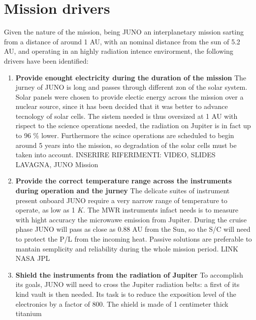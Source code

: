 \section{Mission drivers}
\label{sec:drivers}

Given the nature of the mission, being JUNO an interplanetary mission sarting from a distance of around 1 AU, with an nominal distance from the sun of 5.2 AU, and operating in an highly radiation 
intence envirorment, the following drivers have been identified: 

\begin{enumerate}[leftmargin=1.5em]
    \item \textbf{Provide enought electricity during the duration of the mission} 
    \newline The jurney of JUNO is long and passes through different zon of the solar system. Solar panels were chosen to provide 
    electic energy across the mission over a nuclear source, since it has been decided that it was better to advance tecnology
    of solar cells. The sistem needed is thus oversized at 1 AU with rispect to the science operations needed, the radiation on Jupiter is in fact up to 96 \% lower. Furthermore the scince operations are scheduled to begin around 5 years into the mission, so degradation of the solar cells 
    must be taken into account. INSERIRE RIFERIMENTI: VIDEO, SLIDES LAVAGNA, JUNO Mission
    \item \textbf{Provide the correct temperature range across the instruments during operation and the jurney}
    \newline The delicate suites of instrument present onboard JUNO require a very narrow range of temperature to operate, as 
    low as 1 $K$. The MWR instruments infact needs is to measure with hight accuracy the microwawe emission from Jupiter. During the cruise phase JUNO will
    pass as close as 0.88 AU from the Sun, so the S/C will need to protect the P/L from the incoming heat. Passive solutions are preferable to mantain semplicity 
    and reliability during the whole mission period. LINK NASA JPL 
    \item \textbf{Shield the instruments from the radiation of Jupiter}
    \newline To accomplish its goals, JUNO will need to cross the Jupiter radiation belts: a first of its kind vault is then needed. Its task is to reduce the exposition level of the electronics by a factor of 800. The shield is made of 1 centimeter thick titanium
\end{enumerate}  